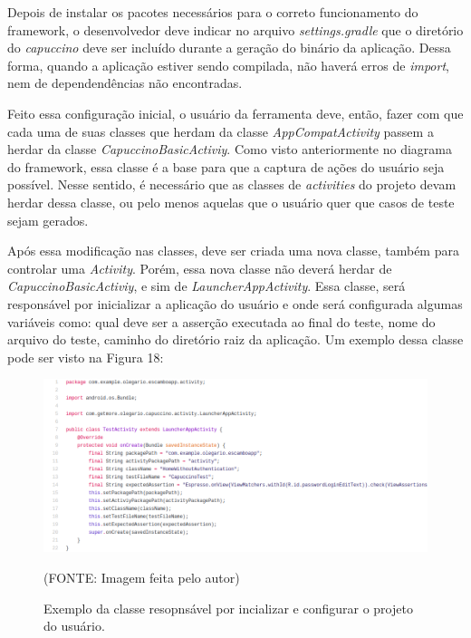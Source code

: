 \documentclass[
    12pt,       %
    openright,      %
    twoside,      %
    a4paper,      %
    english,      %
    french,       %
    spanish,      %
    brazil,       %
    ]{abntex2}
\begin{document}
        Depois de instalar os pacotes necessários para o correto funcionamento do framework, o desenvolvedor
        deve indicar no arquivo \textit{settings.gradle} que o diretório do \textit{capuccino} deve ser
        incluído durante a geração do binário da aplicação. Dessa forma, quando a aplicação estiver sendo
        compilada, não haverá erros de \textit{import}, nem de dependendências não encontradas.

        Feito essa configuração inicial, o usuário da ferramenta deve, então, fazer com que cada uma de suas
        classes que herdam da classe \textit{AppCompatActivity} passem a herdar da classe
        \textit{CapuccinoBasicActiviy}. Como visto anteriormente no diagrama do framework, essa classe é
        a base para que a captura de ações do usuário seja possível. Nesse sentido, é necessário que as
        classes de \textit{activities} do projeto devam herdar dessa classe, ou pelo menos aquelas que o
        usuário quer que casos de teste sejam gerados.

        Após essa modificação nas classes, deve ser criada uma nova classe, também para controlar uma
        \textit{Activity}. Porém, essa nova classe não deverá herdar de \textit{CapuccinoBasicActiviy},
        e sim de \textit{LauncherAppActivity}. Essa classe, será responsável por inicializar a aplicação
        do usuário e onde será configurada algumas variáveis como: qual deve ser a asserção executada ao
        final do teste, nome do arquivo do teste, caminho do diretório raiz da aplicação. Um exemplo
        dessa classe pode ser visto na Figura 18:

        \begin{figure}[htbp]
          \begin{center}
            \includegraphics[width=1.0\textwidth]{img/testActivity.png}
              \end{center}
            \caption{\label{fig:passaro} Exemplo da classe resopnsável por incializar e configurar o projeto do usuário.}
          \begin{center}(FONTE: Imagem feita pelo autor)\end{center}
        \end{figure}
\end{document}
